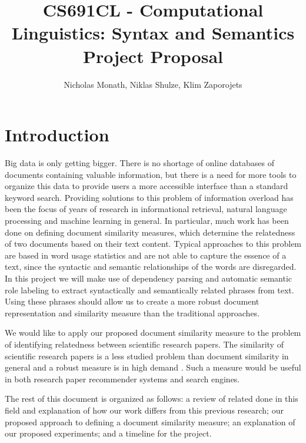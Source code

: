 \documentclass[11pt]{article}
\begin{document}
  \title{CS691CL - Computational Linguistics: Syntax and Semantics \\ Project Proposal}
  \author{Nicholas Monath, Niklas Shulze, Klim Zaporojets}
  \maketitle
  
  
  
\section{Introduction}

Big data is only getting bigger. There is no shortage of online databases of documents containing valuable information, but there is a need for more tools to organize this data to provide users a more accessible interface than a standard keyword search. Providing solutions to this problem of information overload has been the focus of years of research in informational retrieval, natural language processing and machine learning in general. In particular, much work has been done on defining document similarity measures, which determine the relatedness of two documents based on their text content. Typical approaches to this problem are based in word usage statistics and are not able to capture the essence of a text, since the syntactic and semantic relationships of the words are disregarded. In this project we will make use of dependency parsing and automatic semantic role labeling to extract syntactically and semantically related phrases from text. Using these phrases should allow us to create a more robust document representation and similarity measure than the traditional approaches. 

We would like to apply our proposed document similarity measure to the problem of identifying relatedness between scientific research papers. The similarity of scientific research papers is a less studied problem than document similarity in general and a robust measure is in high demand \cite{Hurtado2013}. Such a measure would be useful in both research paper recommender systems and search engines. 

The rest of this document is organized as follows: a review of related done in this field and explanation of how our work differs from this previous research; our proposed approach to defining a document similarity measure; an explanation of our proposed experiments; and a timeline for the project.
\end{document}
